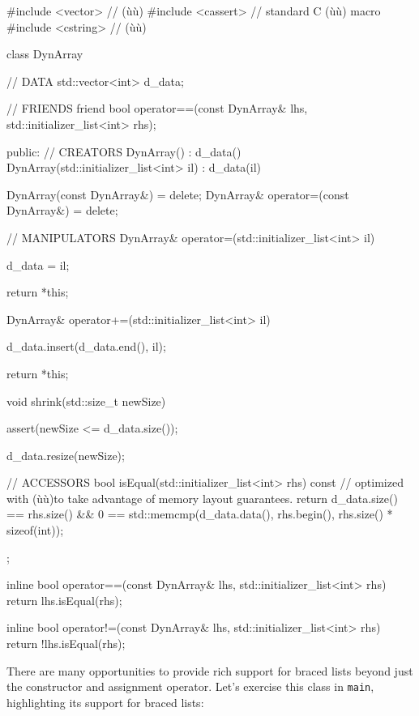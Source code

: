\begin{emcppshiddenlisting}[emcppsbatch=e6]
#include <vector>  // (ù{}ù)
#include <cassert>  // standard C (ù{}ù) macro
#include <cstring>  // (ù{}ù)
\end{emcppshiddenlisting}
\begin{emcppslisting}[emcppsbatch=e6]
class DynArray
{
    // DATA
    std::vector<int> d_data;

    // FRIENDS
    friend bool operator==(const DynArray&            lhs,
                           std::initializer_list<int> rhs);

  public:
    // CREATORS
    DynArray() : d_data() {}
    DynArray(std::initializer_list<int> il) : d_data(il) {}

    DynArray(const DynArray&) = delete;
    DynArray& operator=(const DynArray&) = delete;

    // MANIPULATORS
    DynArray& operator=(std::initializer_list<int> il)
    {
        d_data = il;

        return *this;
    }

    DynArray& operator+=(std::initializer_list<int> il)
    {
        d_data.insert(d_data.end(), il);

        return *this;
    }

    void shrink(std::size_t newSize)
    {
        assert(newSize <= d_data.size());

        d_data.resize(newSize);
    }

    // ACCESSORS
    bool isEqual(std::initializer_list<int> rhs) const
    {
        // optimized with (ù{}ù)to take advantage of memory layout guarantees.
        return d_data.size() == rhs.size()
            && 0 == std::memcmp(d_data.data(),
                                rhs.begin(),
                                rhs.size() * sizeof(int));
    }
};

inline
bool operator==(const DynArray& lhs, std::initializer_list<int> rhs)
{
    return lhs.isEqual(rhs);
}

inline
bool operator!=(const DynArray& lhs, std::initializer_list<int> rhs)
{
    return !lhs.isEqual(rhs);
}
\end{emcppslisting}
    

\noindent There are many opportunities to provide rich support for braced lists
beyond just the constructor and assignment operator. Let's exercise this
class in \lstinline!main!, highlighting its support for braced lists:

